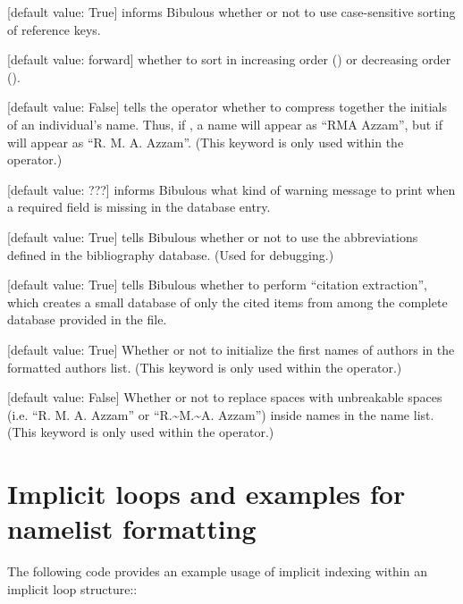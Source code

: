 \documentclass[letterpaper,10pt,english]{sphinxmanual}
\begin{document}
 {[}default value: True{]} informs Bibulous whether or not to use case-sensitive sorting of reference keys.

 {[}default value: forward{]} whether to sort in increasing order () or decreasing order ().

 {[}default value: False{]} tells the  operator whether to compress together the initials of an individual’s name. Thus, if , a name will appear as “RMA Azzam”, but if  will appear as “R. M. A. Azzam”. (This keyword is only used within the  operator.)

 {[}default value: ???{]} informs Bibulous what kind of warning message to print when a required field is missing in the database entry.

 {[}default value: True{]} tells Bibulous whether or not to use the abbreviations defined in the bibliography database. (Used for debugging.)

 {[}default value: True{]} tells Bibulous whether to perform “citation extraction”, which creates a small database of only the cited items from among the complete database provided in the  file.

 {[}default value: True{]} Whether or not to initialize the first names of authors in the formatted authors list. (This keyword is only used within the  operator.)

 {[}default value: False{]} Whether or not to replace spaces with unbreakable spaces (i.e. “R. M. A. Azzam” or “R.\textasciitilde{}M.\textasciitilde{}A. Azzam”) inside names in the name list. (This keyword is only used within the  operator.)


\section{Implicit loops and examples for namelist formatting}
\label{\detokenize{guidelines_for_writing_style_templates:implicit-loops-and-examples-for-namelist-formatting}}
The following code provides an example usage of implicit indexing within an implicit loop structure::
\end{document}
